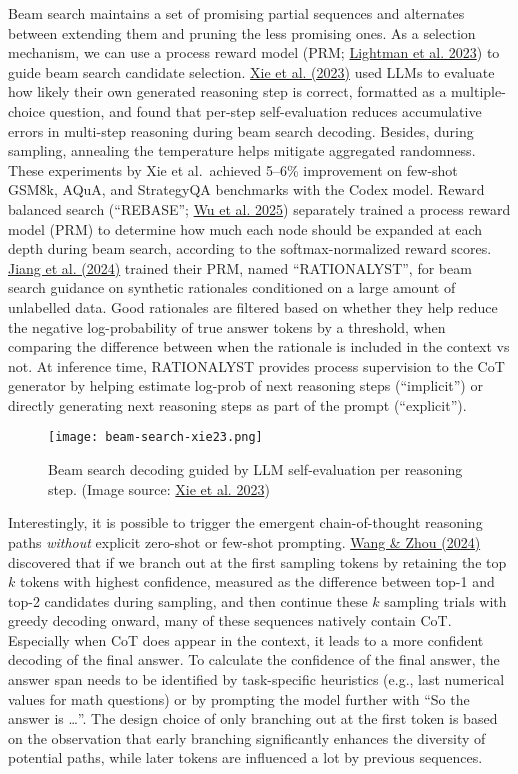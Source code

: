 \documentclass[12pt]{article}
\begin{document}
Beam search maintains a set of promising partial sequences and alternates between extending them and pruning the less promising ones. As a selection mechanism, we can use a process reward model (PRM; \href{https://arxiv.org/abs/2305.20050}{Lightman et al. 2023}) to guide beam search candidate selection. \href{https://arxiv.org/abs/2305.00633}{Xie et al. (2023)} used LLMs to evaluate how likely their own generated reasoning step is correct, formatted as a multiple-choice question, and found that per-step self-evaluation reduces accumulative errors in multi-step reasoning during beam search decoding. Besides, during sampling, annealing the temperature helps mitigate aggregated randomness. These experiments by Xie et al.\ achieved 5--6\% improvement on few-shot GSM8k, AQuA, and StrategyQA benchmarks with the Codex model. Reward balanced search (``REBASE''; \href{https://arxiv.org/abs/2408.00724}{Wu et al. 2025}) separately trained a process reward model (PRM) to determine how much each node should be expanded at each depth during beam search, according to the softmax-normalized reward scores. \href{https://arxiv.org/abs/2410.01044}{Jiang et al. (2024)} trained their PRM, named ``RATIONALYST'', for beam search guidance on synthetic rationales conditioned on a large amount of unlabelled data. Good rationales are filtered based on whether they help reduce the negative log-probability of true answer tokens by a threshold, when comparing the difference between when the rationale is included in the context vs not. At inference time, RATIONALYST provides process supervision to the CoT generator by helping estimate log-prob of next reasoning steps (``implicit'') or directly generating next reasoning steps as part of the prompt (``explicit'').

\begin{figure}[h]
    \centering
    \texttt{[image: beam-search-xie23.png]}
    \caption{Beam search decoding guided by LLM self-evaluation per reasoning step. (Image source: \href{https://arxiv.org/abs/2305.00633}{Xie et al. 2023})}
\end{figure}

Interestingly, it is possible to trigger the emergent chain-of-thought reasoning paths \emph{without} explicit zero-shot or few-shot prompting. \href{https://arxiv.org/abs/2402.10200}{Wang \& Zhou (2024)} discovered that if we branch out at the first sampling tokens by retaining the top $k$ tokens with highest confidence, measured as the difference between top-1 and top-2 candidates during sampling, and then continue these $k$ sampling trials with greedy decoding onward, many of these sequences natively contain CoT. Especially when CoT does appear in the context, it leads to a more confident decoding of the final answer. To calculate the confidence of the final answer, the answer span needs to be identified by task-specific heuristics (e.g., last numerical values for math questions) or by prompting the model further with ``So the answer is \ldots''. The design choice of only branching out at the first token is based on the observation that early branching significantly enhances the diversity of potential paths, while later tokens are influenced a lot by previous sequences.
\end{document}
